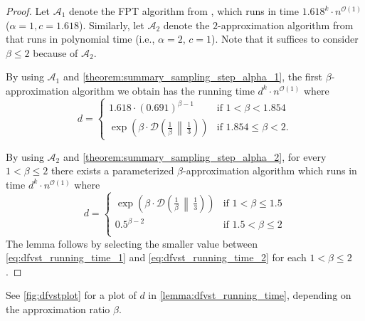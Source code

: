 \documentclass[letterpaper,11pt]{article}
\newcommand{\1}[1]{\mathds{1}\left[#1\right]}
\newcommand{\D}[2]{\mathcal{D}\left(#1\, \middle\|\,#2 \right)}
\newcommand{\Oh}{\mathcal{O}}
\begin{document}
\begin{proof}
	Let $\mathcal{A}_1$ denote the FPT algorithm from \cite{kumarFasterExactParameterized2016}, which runs in time $1.618^{k} \cdot n^{\Oh(1)}$
	($\alpha = 1, c = 1.618$).
	Similarly, let $\mathcal{A}_2$ denote the $2$-approximation algorithm from \cite{lokshtanov2ApproximatingFeedbackVertex2021} that runs in polynomial time
	(i.e., $\alpha = 2$, $c = 1$).
Note that it suffices to consider $\beta \leq 2$ because of $\mathcal{A}_2$.	
	
	By using $\mathcal{A}_1$ and \cref{theorem:summary_sampling_step_alpha_1}, the first $\beta$-approximation algorithm we obtain
	has the running time $d^{k} \cdot n^{\Oh(1)}$ where
	\begin{equation}\label{eq:dfvst_running_time_1}
		d = \begin{cases}
			1.618 \cdot \left(0.691\right) ^{\beta - 1} &\text{if } 1 < \beta < 1.854\\
			\exp\left( \beta \cdot \D{\frac{1}{\beta}}{\frac{1}{3}} \right) &\text{if } 1.854 \leq \beta < 2.
		\end{cases}
	\end{equation}

	By using $\mathcal{A}_2$ and
	\cref{theorem:summary_sampling_step_alpha_2}, for every $1 < \beta \leq
	2$ there exists a parameterized $\beta$-approximation algorithm
	which runs in time $d^{k}
	\cdot n^{\Oh(1)}$ where
	\begin{equation}\label{eq:dfvst_running_time_2}
		d = \begin{cases}
			\exp\left( \beta \cdot \D{\frac{1}{\beta}}{\frac{1}{3}} \right) &\text{if } 1 < \beta \leq 1.5 \\
			0.5^{\beta - 2} &\text{if } 1.5 < \beta \leq 2 \\
		\end{cases}
	\end{equation}
	The lemma follows by selecting the smaller value between
	\eqref{eq:dfvst_running_time_1} and \eqref{eq:dfvst_running_time_2} for each $1 < \beta
	\leq 2$.
	
\end{proof}

See \cref{fig:dfvstplot} for a plot of $d$ in \cref{lemma:dfvst_running_time}, depending on
the approximation ratio $\beta$.
\end{document}
